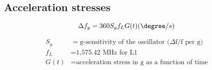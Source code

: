 \begin{comment}
In recent years significant progress has been made in
crystal resonator design to effect a substantial reduction in
g-sensitivity values [1]. With such reduced levels of
acceleration sensitivity, the need has arisen for a
measurement system with appropriately higher resolution.
The most obvious method for determination of g-sensitivity
for a stable ovenized oscillator is the '2g tip over
test', where the whole oscillator is simply inverted, resulting
in an incremental 2g change in the internal forces applied to
the resonator [2]. However, since the changes are in the
order of 1.10-9 per g, the oscillator temperature must be prestabilized,
and this can be a long process. With this method,
care must also be taken to avoid convectional temperature
effects in the oven cavity, which can cause misleading
results.
In this work, for g-sensitivity measurement, the method
that has been implemented is based on the imposition of an
essentially sinusoidal low frequency vibration field on the
resonator by placing the device on a vibration table, and
then observing the modulation effects on the resonator
frequency.
The method is applicable to any repetitive stimulus to
which the frequency of the resonator exhibits sensitivity.
Such stimuli could include pressure, electromagnetic
radiation effects, magnetic fields, neutron radiation, and so
on.
\end{comment}



\subsection{Acceleration stresses}

\begin{equation}
\Delta f_g = 360 S_g f_L G(t) (\degree/s)
\end{equation}

\begin{align*}
S_g &= \text{g-sensitivity of the oscillator (}\Delta \text{f/f per g)}\\
f_L &= \text{1,575.42 MHz for L1} \\
G(t) &= \text{acceleration stress in g as a function of time}
\end{align*}


